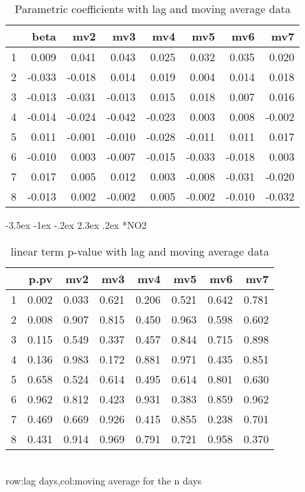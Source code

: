 \documentclass[a4paper, 12pt]{article}
\makeatletter
\def\large{\fontsize{14}{20}\selectfont}
\renewcommand\subsection{\@startsection {subsection}{1}{\z@}%
                                   {-3.5ex \@plus -1ex \@minus -.2ex}%
                                   {2.3ex \@plus.2ex}%
                                   {\centering\normalfont\large\bfseries}}
\makeatother
\begin{document}
\begin{table}[h]
\centering
\caption{Parametric coefficients with lag and moving average data}
\begin{tabular}{rrrrrrrr}
  \hline
 & beta & mv2 & mv3 & mv4 & mv5 & mv6 & mv7 \\
  \hline
1 & 0.009 & 0.041 & 0.043 & 0.025 & 0.032 & 0.035 & 0.020 \\
  2 & -0.033 & -0.018 & 0.014 & 0.019 & 0.004 & 0.014 & 0.018 \\
  3 & -0.013 & -0.031 & -0.013 & 0.015 & 0.018 & 0.007 & 0.016 \\
  4 & -0.014 & -0.024 & -0.042 & -0.023 & 0.003 & 0.008 & -0.002 \\
  5 & 0.011 & -0.001 & -0.010 & -0.028 & -0.011 & 0.011 & 0.017 \\
  6 & -0.010 & 0.003 & -0.007 & -0.015 & -0.033 & -0.018 & 0.003 \\
  7 & 0.017 & 0.005 & 0.012 & 0.003 & -0.008 & -0.031 & -0.020 \\
  8 & -0.013 & 0.002 & -0.002 & 0.005 & -0.002 & -0.010 & -0.032 \\
   \hline
\end{tabular}
\end{table}
\clearpage
\subsection*{NO2}
\begin{table}[h]
\centering
\caption{linear term p-value with lag and moving average data}
\begin{tabular}{rrrrrrrr}
  \hline
 & p.pv & mv2 & mv3 & mv4 & mv5 & mv6 & mv7 \\
  \hline
1 & 0.002 & 0.033 & 0.621 & 0.206 & 0.521 & 0.642 & 0.781 \\
  2 & 0.008 & 0.907 & 0.815 & 0.450 & 0.963 & 0.598 & 0.602 \\
  3 & 0.115 & 0.549 & 0.337 & 0.457 & 0.844 & 0.715 & 0.898 \\
  4 & 0.136 & 0.983 & 0.172 & 0.881 & 0.971 & 0.435 & 0.851 \\
  5 & 0.658 & 0.524 & 0.614 & 0.495 & 0.614 & 0.801 & 0.630 \\
  6 & 0.962 & 0.812 & 0.423 & 0.931 & 0.383 & 0.859 & 0.962 \\
  7 & 0.469 & 0.669 & 0.926 & 0.415 & 0.855 & 0.238 & 0.701 \\
  8 & 0.431 & 0.914 & 0.969 & 0.791 & 0.721 & 0.958 & 0.370 \\
   \hline
\end{tabular}
\\row:lag days,col:moving average for the n days
\end{table}
\end{document}
